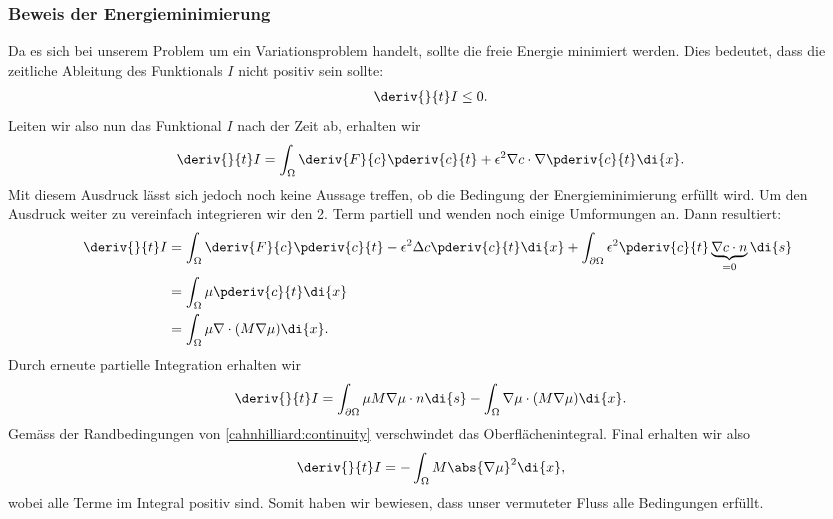 \subsubsection{Beweis der Energieminimierung}
Da es sich bei unserem Problem um ein Variationsproblem handelt,
sollte die freie Energie minimiert werden.
Dies bedeutet, dass die zeitliche Ableitung des Funktionals  $I$
nicht positiv sein sollte:
\begin{align*}
\deriv{}{t} I
&\leq
0
.
\end{align*}
Leiten wir also nun das Funktional $I$ nach der Zeit ab,
erhalten wir
\begin{align*}
\deriv{}{t} I
&=
\int_\Omega \deriv{F}{c} \pderiv{c}{t}
+ \epsilon^2 \nabla c \cdot \nabla \pderiv{c}{t} \di{x}
.
\end{align*}
Mit diesem Ausdruck lässt sich jedoch noch keine Aussage treffen,
ob die Bedingung der Energieminimierung erfüllt wird.
Um den Ausdruck weiter zu vereinfach integrieren wir den 2. Term partiell
und wenden noch einige Umformungen an.
Dann resultiert:
\begin{align*}
\deriv{}{t} I
&=
\int_\Omega \deriv{F}{c} \pderiv{c}{t} - \epsilon^2 \Delta c \pderiv{c}{t} \di{x}
+ \int_{\partial\Omega} \epsilon^2 \pderiv{c}{t} \underbrace{\nabla c\cdot n}_{=0} \di{s}
\\
&=
\int_\Omega \mu \pderiv{c}{t} \di{x}
\\
&=
\int_\Omega \mu \nabla \cdot (M \nabla \mu) \di{x}
.
\end{align*}
Durch erneute partielle Integration erhalten wir
\begin{align*}
\deriv{}{t} I
&=
\int_{\partial\Omega} \mu M \nabla \mu \cdot n \di{s} - \int_\Omega \nabla \mu \cdot (M \nabla \mu) \di{x}
.
\end{align*}
Gemäss der Randbedingungen von \eqref{cahnhilliard:continuity}
verschwindet das Oberflächenintegral.
Final erhalten wir also
\begin{align*}
\deriv{}{t} I
&=
-\int_\Omega M \abs{\nabla \mu}^2 \di{x}
,
\end{align*}
wobei alle Terme im Integral positiv sind.
Somit haben wir bewiesen,
dass unser vermuteter Fluss alle Bedingungen erfüllt.

